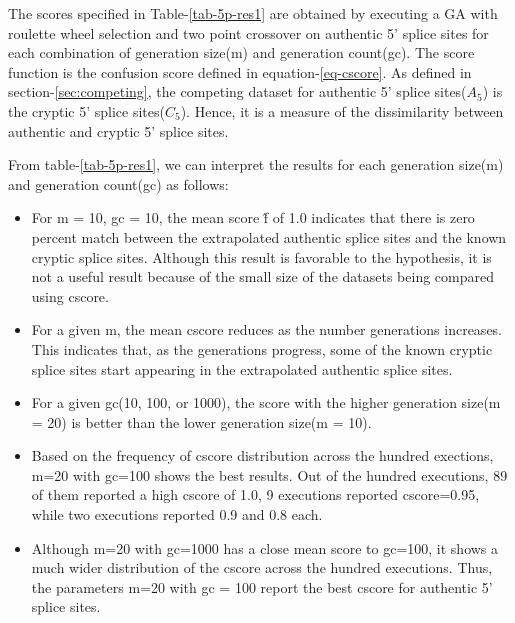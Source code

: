 The scores specified in Table-\ref{tab-5p-res1} are obtained by executing a GA with roulette wheel selection and two point crossover on authentic 5' splice sites for each combination of generation size(m) and generation count(gc). The score function is the confusion score defined in equation-\ref{eq-cscore}. As defined in section-\ref{sec:competing}, the competing dataset for authentic 5' splice sites($A_5$) is the cryptic 5' splice sites($C_5$). Hence, it is a measure of the dissimilarity between authentic and cryptic 5' splice sites. \par
From table-\ref{tab-5p-res1}, we can interpret the results for each generation size(m) and generation count(gc) as follows:
\begin{itemize}
	\item For m = 10, gc = 10, the mean score \^{f} of 1.0 indicates that there is zero percent match between the extrapolated authentic splice sites and the known cryptic splice sites. Although this result is favorable to the hypothesis, it is not a useful result because of the small size of the datasets being compared using cscore.
	\item For a given m, the mean cscore reduces as the number generations increases. This indicates that, as the generations progress, some of the known cryptic splice sites start appearing in the extrapolated authentic splice sites.
	\item For a given gc(10, 100, or 1000), the score with the higher generation size(m = 20) is better than the lower generation size(m = 10).
	\item Based on the frequency of cscore distribution across the hundred exections, m=20 with gc=100 shows the best results. Out of the hundred executions, 89 of them reported a high cscore of 1.0, 9 executions reported cscore=0.95, while two executions reported 0.9 and 0.8 each.
	\item Although m=20 with gc=1000 has a close mean score to gc=100, it shows a much wider distribution of the cscore across the hundred executions. Thus, the parameters m=20 with gc = 100 report the best cscore for authentic 5' splice sites.
\end{itemize} 

